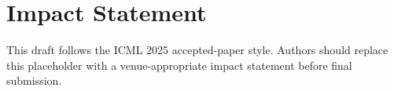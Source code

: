 \documentclass{article}
\theoremstyle{plain}
\theoremstyle{definition}
\theoremstyle{remark}
\begin{document}

\printAffiliationsAndNotice{}

\begin{abstract}
\end{abstract}


\section*{Impact Statement}
This draft follows the ICML 2025 accepted-paper style. Authors should replace this placeholder with a venue-appropriate impact statement before final submission.



\end{document}
